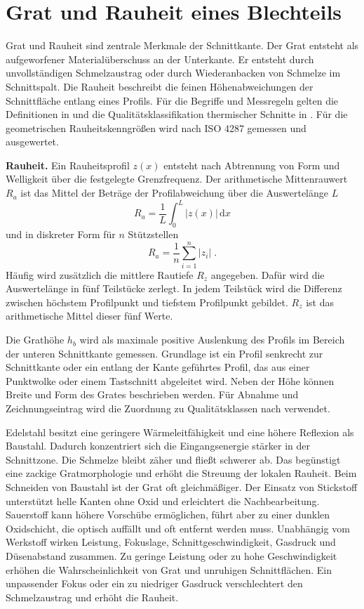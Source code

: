 \section{Grat und Rauheit eines Blechteils}

\label{sec:grat-rauheit}

Grat und Rauheit sind zentrale Merkmale der Schnittkante. Der Grat entsteht als aufgeworfener Materialüberschuss an der Unterkante. Er entsteht durch unvollständigen Schmelzaustrag oder durch Wiederanbacken von Schmelze im Schnittspalt. Die Rauheit beschreibt die feinen Höhenabweichungen der Schnittfläche entlang eines Profils. Für die Begriffe und Messregeln gelten die Definitionen in \parencite{ISO11145-2018} und die Qualitätsklassifikation thermischer Schnitte in \parencite{ISO9013-2017}. Für die geometrischen Rauheitskenngrößen wird nach ISO 4287 gemessen und ausgewertet.

\textbf{Rauheit.} Ein Rauheitsprofil \(z(x)\) entsteht nach Abtrennung von Form und Welligkeit über die festgelegte Grenzfrequenz. Der arithmetische Mittenrauwert \(R_a\) ist das Mittel der Beträge der Profilabweichung über die Auswertelänge \(L\)
\[
R_a=\frac{1}{L}\int_{0}^{L}\lvert z(x)\rvert\,\mathrm{d}x
\]
und in diskreter Form für \(n\) Stützstellen
\[
R_a=\frac{1}{n}\sum_{i=1}^{n}\lvert z_i\rvert\;.
\]
Häufig wird zusätzlich die mittlere Rautiefe \(R_z\) angegeben. Dafür wird die Auswertelänge in fünf Teilstücke zerlegt. In jedem Teilstück wird die Differenz zwischen höchstem Profilpunkt und tiefstem Profilpunkt gebildet. \(R_z\) ist das arithmetische Mittel dieser fünf Werte. \parencite{ISO9013-2017}

Die Grathöhe \(h_b\) wird als maximale positive Auslenkung des Profils im Bereich der unteren Schnittkante gemessen. Grundlage ist ein Profil senkrecht zur Schnittkante oder ein entlang der Kante geführtes Profil, das aus einer Punktwolke oder einem Tastschnitt abgeleitet wird. Neben der Höhe können Breite und Form des Grates beschrieben werden. Für Abnahme und Zeichnungseintrag wird die Zuordnung zu Qualitätsklassen nach \parencite{ISO9013-2017} verwendet.

Edelstahl besitzt eine geringere Wärmeleitfähigkeit und eine höhere Reflexion als Baustahl. Dadurch konzentriert sich die Eingangsenergie stärker in der Schnittzone. Die Schmelze bleibt zäher und fließt schwerer ab. Das begünstigt eine zackige Gratmorphologie und erhöht die Streuung der lokalen Rauheit. Beim Schneiden von Baustahl ist der Grat oft gleichmäßiger. Der Einsatz von Stickstoff unterstützt helle Kanten ohne Oxid und erleichtert die Nachbearbeitung. Sauerstoff kann höhere Vorschübe ermöglichen, führt aber zu einer dunklen Oxidschicht, die optisch auffällt und oft entfernt werden muss. Unabhängig vom Werkstoff wirken Leistung, Fokuslage, Schnittgeschwindigkeit, Gasdruck und Düsenabstand zusammen. Zu geringe Leistung oder zu hohe Geschwindigkeit erhöhen die Wahrscheinlichkeit von Grat und unruhigen Schnittflächen. Ein unpassender Fokus oder ein zu niedriger Gasdruck verschlechtert den Schmelzaustrag und erhöht die Rauheit.

